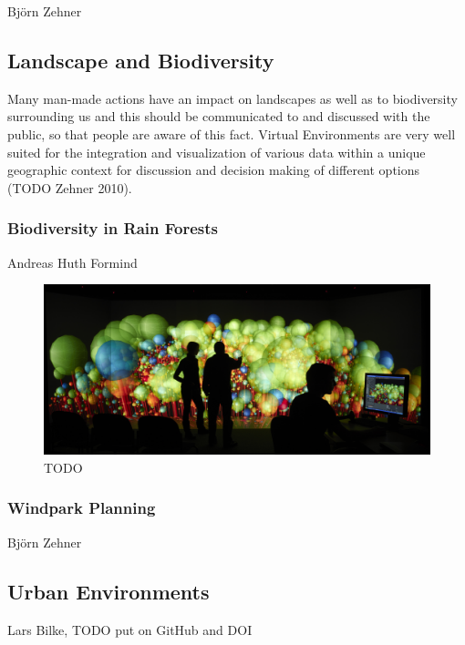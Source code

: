 Bj\"orn Zehner

\subsection{Landscape and Biodiversity}
\label{landscape-and-biodiversity}

Many man-made actions have an impact on landscapes as well as to biodiversity surrounding us and this should be communicated to and discussed with the public, so that people are aware of this fact. Virtual Environments are very well suited for the integration and visualization of various data within a unique geographic context for discussion and decision making of different options (TODO Zehner 2010).

\subsubsection{Biodiversity in Rain Forests}
\label{biodiversity-in-rain-forests}

Andreas Huth Formind \cite{kohler:98}

\begin{figure}
  \includegraphics[width=\linewidth]{images/biodiversity.jpg}
\caption{TODO}
\label{fig:biodiversity}
\end{figure}

\subsubsection{Windpark Planning}
\label{windpark-planning}

Bj\"orn Zehner

\subsection{Urban Environments}
\label{urban-environments}

Lars Bilke, TODO put on GitHub and DOI

